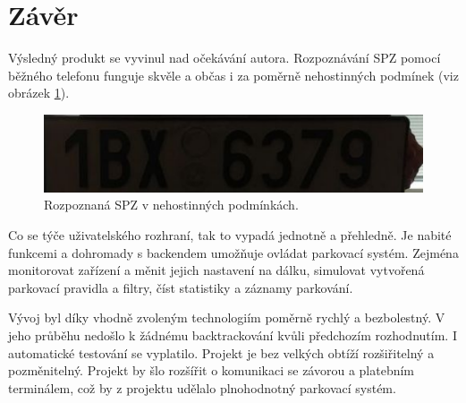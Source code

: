 \chapter*{Závěr}

\noindent
Výsledný produkt se vyvinul nad očekávání autora. Rozpoznávání SPZ 
pomocí běžného telefonu funguje skvěle a
občas i za poměrně nehostinných podmínek (viz obrázek \ref{fig:recogn}).

\begin{figure}[!htb] \centering
  \includegraphics[width=145mm]{../img/example_recognition.png}
  \caption{Rozpoznaná SPZ v nehostinných podmínkách.}
  \label{fig:recogn}
\end{figure}

\noindent
Co se týče uživatelského rozhraní, tak to vypadá jednotně a přehledně.
Je nabité funkcemi a dohromady s backendem umožňuje ovládat parkovací systém. Zejména monitorovat
zařízení a měnit jejich nastavení na dálku, simulovat vytvořená parkovací pravidla
a filtry, číst statistiky a záznamy parkování.

Vývoj byl díky vhodně zvoleným technologiím poměrně rychlý a bezbolestný.
V jeho průběhu nedošlo k žádnému backtrackování kvůli předchozím rozhodnutím.
I automatické testování se vyplatilo.
Projekt je bez velkých obtíží rozšiřitelný a pozměnitelný.
Projekt by šlo rozšířit o komunikaci se závorou a platebním terminálem,
což by z projektu udělalo plnohodnotný parkovací systém.


